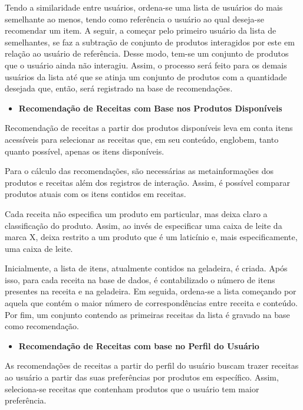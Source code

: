 Tendo a similaridade entre usuários, ordena-se uma lista de usuários do mais semelhante ao menos, tendo como referência o usuário ao qual deseja-se recomendar um item. A seguir, a começar pelo primeiro usuário da lista de semelhantes, se faz a subtração de conjunto de produtos interagidos por este em relação ao usuário de referência. Desse modo, tem-se um conjunto de produtos que o usuário ainda não interagiu. Assim, o processo será feito para os demais usuários da lista até que se atinja um conjunto de produtos com a quantidade desejada que, então, será registrado na base de recomendações.

\begin{itemize}
    \item \textbf{Recomendação de Receitas com Base nos Produtos Disponíveis}
\end{itemize}

Recomendação de receitas a partir dos produtos disponíveis leva em conta itens acessíveis para selecionar as receitas que, em seu conteúdo, englobem, tanto quanto possível, apenas os itens disponíveis.

Para o cálculo das recomendações, são necessárias as metainformações dos produtos e receitas além dos registros de interação. Assim, é possível comparar produtos atuais com os itens contidos em receitas.

Cada receita não especifica um produto em particular, mas deixa claro a classificação do produto. Assim, ao invés de especificar uma caixa de leite da marca X, deixa restrito a um produto que é um laticínio e, mais especificamente, uma caixa de leite.

Inicialmente, a lista de itens, atualmente contidos na geladeira, é criada. Após isso, para cada receita na base de dados, é contabilizado o número de itens presentes na receita e na geladeira. Em seguida, ordena-se a lista começando por aquela que contém o maior número de correspondências entre receita e conteúdo. Por fim, um conjunto contendo as primeiras receitas da lista é gravado na base como recomendação.

\begin{itemize} 
    \item \textbf{Recomendação de Receitas com base no Perfil do Usuário}
\end{itemize}

As recomendações de receitas a partir do perfil do usuário buscam trazer receitas ao usuário a partir das suas preferências por produtos em específico. Assim, seleciona-se receitas que contenham produtos que o usuário tem maior preferência.

